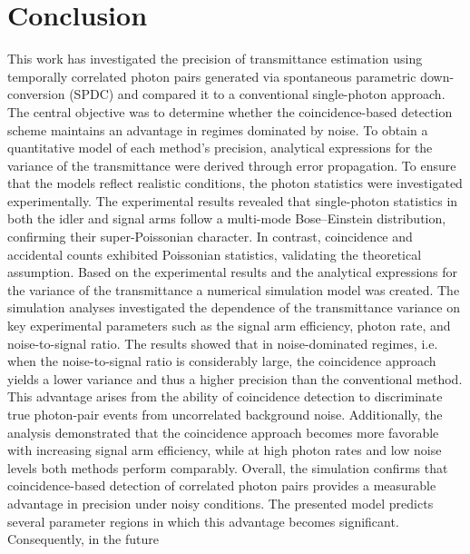 \section{Conclusion}
This work has investigated the precision of transmittance estimation using temporally correlated photon pairs generated via spontaneous parametric down-conversion (SPDC) and compared it to a conventional single-photon approach. The central objective was to determine whether the coincidence-based detection scheme maintains an advantage in regimes dominated by noise. \newline
To obtain a quantitative model of each method’s precision, analytical expressions for the variance of the transmittance were derived through error propagation. To ensure that the models reflect realistic conditions, the photon statistics were investigated experimentally. \newline
The experimental results revealed that single-photon statistics in both the idler and signal arms follow a multi-mode Bose–Einstein distribution, confirming their super-Poissonian character. In contrast, coincidence and accidental counts exhibited Poissonian statistics, validating the theoretical assumption. Based on the experimental results and the analytical expressions for the variance of the transmittance a numerical simulation model was created. \newline
The simulation analyses investigated the dependence of the transmittance variance on key experimental parameters such as the signal arm efficiency, photon rate, and noise-to-signal ratio. The results showed that in noise-dominated regimes, i.e. when the noise-to-signal ratio is considerably large, the coincidence approach yields a lower variance and thus a higher precision than the conventional method. This advantage arises from the ability of coincidence detection to discriminate true photon-pair events from uncorrelated background noise. Additionally, the analysis demonstrated that the coincidence approach becomes more favorable with increasing signal arm efficiency, while at high photon rates and low noise levels both methods perform comparably. \newline
Overall, the simulation confirms that coincidence-based detection of correlated photon pairs provides a measurable advantage in precision under noisy conditions. The presented model predicts several parameter regions in which this advantage becomes significant. Consequently, in the future


